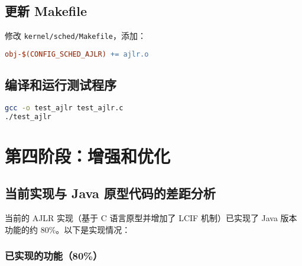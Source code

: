 \documentclass[a4paper,12pt]{article}
\begin{document}
\subsection{更新 Makefile}

修改 \texttt{kernel/sched/Makefile}，添加：

\begin{lstlisting}[language=Makefile]
obj-$(CONFIG_SCHED_AJLR) += ajlr.o
\end{lstlisting}

\subsection{编译和运行测试程序}

\begin{lstlisting}[language=bash]
gcc -o test_ajlr test_ajlr.c
./test_ajlr
\end{lstlisting}

\section{第四阶段：增强和优化}

\subsection{当前实现与 Java 原型代码的差距分析}

当前的 AJLR 实现（基于 C 语言原型并增加了 LCIF 机制）已实现了 Java 版本功能的约 80\%。以下是实现情况：

\subsubsection{已实现的功能（80\%）}
\end{document}
